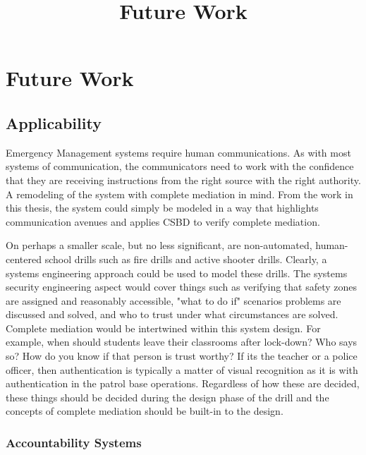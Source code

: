 \documentclass[../../main/main.tex]{subfiles}
\begin{document}
\title{Future Work}
\chapter{Future Work}\label{chp:future}

\section{Applicability}\label{sec:accountability}

Emergency Management systems require human communications.  As with most systems of communication, the communicators need to work with the confidence that they are receiving instructions from the right source with the right authority.  A remodeling of the system with complete mediation in mind.  From the work in this thesis, the system could simply be modeled in a way that highlights communication avenues and applies CSBD to verify complete mediation.

On perhaps a smaller scale, but no less significant, are non-automated, human-centered school drills such as fire drills and active shooter drills.  Clearly, a systems engineering approach could be used to model these drills.  The systems security engineering aspect would cover things such as verifying that safety zones are assigned and reasonably accessible, "what to do if" scenarios problems are discussed and solved, and who to trust under what circumstances are solved.  Complete mediation would be intertwined within this system design.  For example, when should students leave their classrooms after lock-down?  Who says so?  How do you know if that person is trust worthy?  If its the teacher or a police officer, then authentication is typically a matter of visual recognition as it is with authentication in the patrol base operations.  Regardless of how these are decided, these things should be decided during the design phase of the drill and the concepts of complete mediation should be built-in to the design.

      
\subsection{Accountability Systems}\label{sec:accountability}
\end{document}
